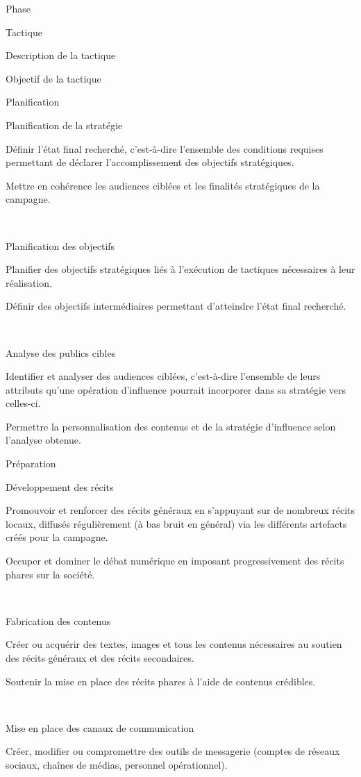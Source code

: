 Phase
	

Tactique
	

Description de la tactique
	

Objectif de la tactique

Planification
	

Planification de la stratégie
	

Définir l’état final recherché, c’est-à-dire l’ensemble des conditions requises permettant de déclarer l’accomplissement des objectifs stratégiques.
	

Mettre en cohérence les audiences ciblées et les finalités stratégiques de la campagne.

​
	

Planification des objectifs
	

Planifier des objectifs stratégiques liés à l’exécution de tactiques nécessaires à leur réalisation.
	

Définir des objectifs intermédiaires permettant d’atteindre l’état final recherché.

​
	

Analyse des publics cibles
	

Identifier et analyser des audiences ciblées, c’est-à-dire l’ensemble de leurs attributs qu’une opération d’influence pourrait incorporer dans sa stratégie vers celles-ci.
	

Permettre la personnalisation des contenus et de la stratégie d’influence selon l’analyse obtenue.

Préparation
	

Développement des récits
	

Promouvoir et renforcer des récits généraux en s’appuyant sur de nombreux récits locaux, diffusés régulièrement (à bas bruit en général) via les différents artefacts créés pour la campagne.
	

Occuper et dominer le débat numérique en imposant progressivement des récits phares sur la société.

​
	

Fabrication des contenus
	

Créer ou acquérir des textes, images et tous les contenus nécessaires au soutien des récits généraux et des récits secondaires.
	

Soutenir la mise en place des récits phares à l’aide de contenus crédibles.

​
	

Mise en place des canaux de communication
	

Créer, modifier ou compromettre des outils de messagerie (comptes de réseaux sociaux, chaînes de médias, personnel opérationnel).
	

